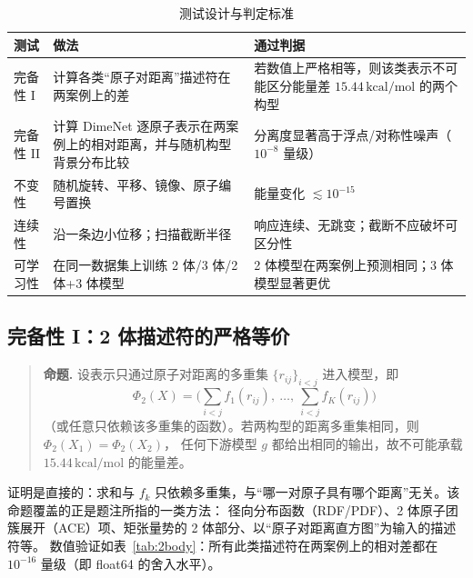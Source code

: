 \documentclass[UTF8,a4paper,11pt]{ctexart}
\newcommand{\kcal}{\,\mathrm{kcal/mol}}
\begin{document}
\begin{table}[H]
\centering\small
\caption{测试设计与判定标准}
\label{tab:design}
\begin{tabular}{@{}p{2.6cm}p{5.4cm}p{6.4cm}@{}}
\toprule
测试 & 做法 & 通过判据\\
\midrule
完备性 I & 计算各类“原子对距离”描述符在两案例上的差 & 若数值上严格相等，则该类表示不可能区分能量差 $15.44\kcal$ 的两个构型\\
完备性 II & 计算 DimeNet 逐原子表示在两案例上的相对距离，并与随机构型背景分布比较 & 分离度显著高于浮点/对称性噪声（$10^{-8}$ 量级）\\
不变性 & 随机旋转、平移、镜像、原子编号置换 & 能量变化 $\lesssim10^{-15}$\\
连续性 & 沿一条边小位移；扫描截断半径 & 响应连续、无跳变；截断不应破坏可区分性\\
可学习性 & 在同一数据集上训练 2 体/3 体/2 体+3 体模型 & 2 体模型在两案例上预测相同；3 体模型显著更优\\
\bottomrule
\end{tabular}
\end{table}

\subsection{完备性 I：2 体描述符的严格等价}
\label{sec:theory}\label{sec:2body}
\begin{quote}
\textbf{命题.} 设表示只通过原子对距离的多重集 $\{r_{ij}\}_{i<j}$ 进入模型，即
\[
\Phi_2(X)=\Big(\sum_{i<j}f_1(r_{ij}),\ \dots,\ \sum_{i<j}f_K(r_{ij})\Big)
\]
（或任意只依赖该多重集的函数）。若两构型的距离多重集相同，则 $\Phi_2(X_1)=\Phi_2(X_2)$，
任何下游模型 $g$ 都给出相同的输出，故不可能承载 $15.44\kcal$ 的能量差。
\end{quote}
证明是直接的：求和与 $f_k$ 只依赖多重集，与“哪一对原子具有哪个距离”无关。该命题覆盖的正是题注所指的一类方法：
径向分布函数（RDF/PDF）、2 体原子团簇展开（ACE）项、矩张量势的 2 体部分、以“原子对距离直方图”为输入的描述符等。
数值验证如表~\ref{tab:2body}：所有此类描述符在两案例上的相对差都在 $10^{-16}$ 量级（即 float64 的舍入水平）。
\end{document}

